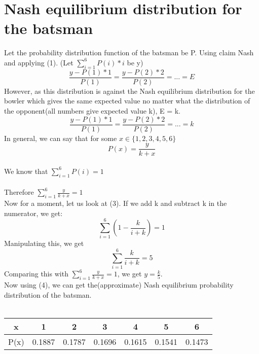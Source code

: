 \documentclass{article}
\begin{document}
\section{Nash equilibrium distribution for the batsman}
Let the probability distribution function of the batsman be P. Using claim Nash and applying (1). (Let $\sum_{i = 1}^6P(i)*i$ be y)
$$\frac{y - P(1)*1}{P(1)} = \frac{y - P(2)*2}{P(2)} = ... = E$$
However, as this distribution is against the Nash equilibrium distribution for the bowler which gives the same expected value no matter what the distribution of the opponent(all numbers give expected value k), E = k.
$$\frac{y - P(1)*1}{P(1)} = \frac{y - P(2)*2}{P(2)} = ... = k$$
In general, we can say that for some $x \in \{1,2,3,4,5,6\}$
\begin{equation}P(x) = \frac{y}{k + x}\end{equation}
\\
We know that $\sum_{i = 1}^6 P(i) = 1$
\\
\\
Therefore $\sum_{i = 1}^6 \frac{y}{k + x} = 1$
\\
Now for a moment, let us look at (3). If we add k and subtract k in the numerator, we get:
$$\sum_{i = 1}^6 \left(1 - \frac{k}{i + k}\right) = 1$$
Manipulating this, we get
$$\sum_{i = 1}^6 \frac{k}{i + k} = 5$$
Comparing this with $\sum_{i = 1}^6 \frac{y}{k + x} = 1$, we get $y = \frac{k}{5}$.
\\
Now using (4), we can get the(approximate) Nash equilibrium probability distribution of the batsman.
\\
\\
\begin{tabular}{|c|c|c|c|c|c|c|}
    \hline
    x & 1 & 2 & 3 & 4 & 5 & 6\\\hline
    P(x) & 0.1887 & 0.1787 & 0.1696 & 0.1615 & 0.1541 & 0.1473\\\hline
\end{tabular}
\\
\end{document}
